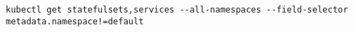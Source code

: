 \begin{verbatim}
kubectl get statefulsets,services --all-namespaces --field-selector metadata.namespace!=default
\end{verbatim}